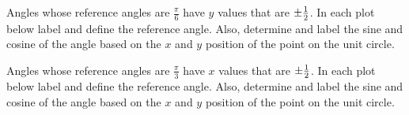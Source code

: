 \vfill

\clearpage

Angles whose reference angles are $\frac{\pi}{6}$ have $y$ values that
are $\pm\mbox{$\frac{1}{2}$}$. In each plot below label and define the reference
angle. Also, determine and label the sine and cosine of the angle
based on the $x$ and $y$ position of the point on the unit circle.


\begin{minipage}{0.5\linewidth}
\end{minipage}
\begin{minipage}{0.5\linewidth}
\end{minipage}


\vspace{3em}

\begin{minipage}{0.5\linewidth}
\end{minipage}
\begin{minipage}{0.5\linewidth}
\end{minipage}

\vfill

\clearpage

Angles whose reference angles are $\frac{\pi}{3}$ have $x$ values that
are $\pm\mbox{$\frac{1}{2}$}$. In each plot below label and define the reference
angle. Also, determine and label the sine and cosine of the angle
based on the $x$ and $y$ position of the point on the unit circle.


